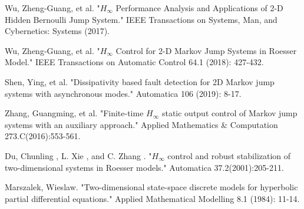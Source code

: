 \documentclass[conference]{IEEEtran}
\begin{document}
\begin{thebibliography}{1}
	Wu, Zheng-Guang, et al. "$H_{\infty}$ Performance Analysis and Applications of 2-D Hidden Bernoulli Jump System." IEEE Transactions on Systems, Man, and Cybernetics: Systems (2017).
	
	Wu, Zheng-Guang, et al. "$H_{\infty}$ Control for 2-D Markov Jump Systems in Roesser Model." IEEE Transactions on Automatic Control 64.1 (2018): 427-432.
	
	Shen, Ying, et al. "Dissipativity based fault detection for 2D Markov jump systems with asynchronous modes." Automatica 106 (2019): 8-17.
	
	
	Zhang, Guangming, et al. "Finite-time $H_{\infty}$ static output control of Markov jump systems with an auxiliary approach." Applied Mathematics \& Computation 273.C(2016):553-561.
	
	Du, Chunling , L. Xie , and C. Zhang . "$H_{\infty}$ control and robust stabilization of two-dimensional systems in Roesser models." Automatica 37.2(2001):205-211.
	
	Marszalek, Wieslaw. "Two-dimensional state-space discrete models for hyperbolic partial differential equations." Applied Mathematical Modelling 8.1 (1984): 11-14.
	
	
	
\end{thebibliography}




\end{document}
